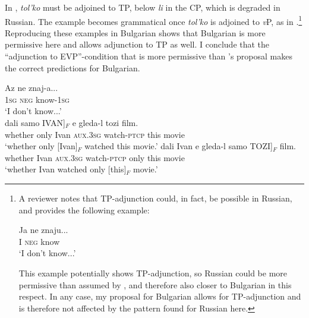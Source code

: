 \documentclass[output=paper,colorlinks,citecolor=brown]{langscibook}
\begin{document}
\noindent In , \textit{tol'ko} must be adjoined to TP, below \textit{li} in the CP, which is degraded in Russian. The example becomes grammatical once \textit{tol'ko} is adjoined to \textit{v}P, as in  \citep[428-429]{Zanon2018}.\footnote{A reviewer notes that TP-adjunction could, in fact, be possible in Russian, and provides the following example: 

\ea 
\gll Ja ne znaju...\\ 
I \textsc{neg} know \\ 
\glt `I don't know...' \\
\z
\z  \par 

\noindent This example potentially shows TP-adjunction, so Russian could be more permissive than assumed by \citet{Zanon2018}, and therefore also closer to Bulgarian in this respect. In any case, my proposal for Bulgarian allows for TP-adjunction and is therefore not affected by the pattern found for Russian here.} Reproducing these examples in Bulgarian shows that Bulgarian is more permissive here and allows adjunction to TP as well. I conclude that the ``adjunction to EVP''-condition that is more permissive than \citeauthor{Zanon2018}'s proposal makes the correct predictions for Bulgarian.

\ea\label{TPdata:2}
\gll Az ne znaj-a...\\ 
\textsc{1sg} \textsc{neg} know-\textsc{1sg} \\ 
\glt `I don't know...' \\
\ea
\gll dali samo \minsp{[} IVAN]$_{F}$ e gleda-l tozi film. \\
whether only {} Ivan \textsc{aux.3sg} watch-\textsc{ptcp} this movie  \\
\glt `whether only [Ivan]$_{F}$ watched this movie.’
\ex
\gll dali Ivan e gleda-l samo \minsp{[} TOZI]$_{F}$ film. \\
whether Ivan \textsc{aux.3sg} watch-\textsc{ptcp} only {} this movie  \\
\glt `whether Ivan watched only [this]$_{F}$ movie.’
\z
\z   
 
\end{document}
